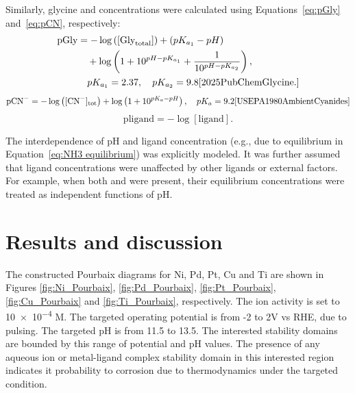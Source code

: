 \documentclass[journal=jacsat,manuscript=article]{achemso}
\begin{document}
Similarly, glycine and  concentrations were calculated using Equations~\eqref{eq:pGly} and~\eqref{eq:pCN}, respectively:
\begin{align} \label{eq:pGly}
\text{pGly} &= -\log \left([\text{Gly}_{\text{total}}]\right) + (pK_{a_1} - pH) \nonumber \\
&\quad + \log \left(1 + 10^{pH - pK_{a_1}} + \frac{1}{10^{pH - pK_{a_2}}} \right), \nonumber \\
&\quad pK_{a_1} = 2.37, \quad pK_{a_2} = 9.8 \cite{2025PubChemGlycine.}
\end{align}
\begin{equation} \label{eq:pCN}
\text{pCN}^- = -\log \left([\text{CN}^-]_{\text{tot}}\right) + \log \left(1 + 10^{pK_a - pH} \right), \quad pK_a = 9.2 \cite{USEPA1980AmbientCyanides}
\end{equation}
\begin{equation} \label{eq:pligand}
\text{pligand} = -\log[\text{ligand}].
\end{equation}

The interdependence of pH and ligand concentration (e.g., due to  equilibrium in Equation~\eqref{eq:NH3 equilibrium}) was explicitly modeled. It was further assumed that ligand concentrations were unaffected by other ligands or external factors. For example, when both  and  were present, their equilibrium concentrations were treated as independent functions of pH.



\section{Results and discussion}
The constructed Pourbaix diagrams for Ni, Pd, Pt, Cu and Ti are shown in Figures \ref{fig:Ni_Pourbaix}, \ref{fig:Pd_Pourbaix}, \ref{fig:Pt_Pourbaix}, \ref{fig:Cu_Pourbaix} and \ref{fig:Ti_Pourbaix}, respectively. The ion activity is set to \num{10e-4} M. The targeted operating potential is from -2 to 2V vs RHE, due to pulsing. The targeted pH is from 11.5 to 13.5. The interested stability domains are bounded by  this range of potential and pH values. The presence of any aqueous ion or metal-ligand complex stability domain in this interested region indicates it probability to corrosion due to thermodynamics under the targeted condition. 
\end{document}
